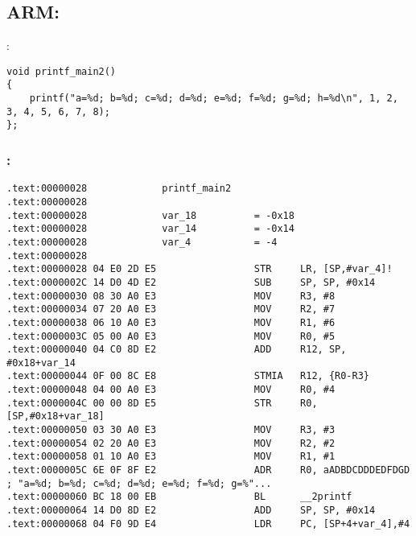 ﻿\subsection{ARM: }

:

\begin{lstlisting}
void printf_main2()
{
	printf("a=%d; b=%d; c=%d; d=%d; e=%d; f=%d; g=%d; h=%d\n", 1, 2, 3, 4, 5, 6, 7, 8);
};
\end{lstlisting}

\subsubsection{\OptimizingKeil: \ARMMode}

\begin{lstlisting}
.text:00000028             printf_main2
.text:00000028
.text:00000028             var_18          = -0x18
.text:00000028             var_14          = -0x14
.text:00000028             var_4           = -4
.text:00000028
.text:00000028 04 E0 2D E5                 STR     LR, [SP,#var_4]!
.text:0000002C 14 D0 4D E2                 SUB     SP, SP, #0x14
.text:00000030 08 30 A0 E3                 MOV     R3, #8
.text:00000034 07 20 A0 E3                 MOV     R2, #7
.text:00000038 06 10 A0 E3                 MOV     R1, #6
.text:0000003C 05 00 A0 E3                 MOV     R0, #5
.text:00000040 04 C0 8D E2                 ADD     R12, SP, #0x18+var_14
.text:00000044 0F 00 8C E8                 STMIA   R12, {R0-R3}
.text:00000048 04 00 A0 E3                 MOV     R0, #4
.text:0000004C 00 00 8D E5                 STR     R0, [SP,#0x18+var_18]
.text:00000050 03 30 A0 E3                 MOV     R3, #3
.text:00000054 02 20 A0 E3                 MOV     R2, #2
.text:00000058 01 10 A0 E3                 MOV     R1, #1
.text:0000005C 6E 0F 8F E2                 ADR     R0, aADBDCDDDEDFDGD ; "a=%d; b=%d; c=%d; d=%d; e=%d; f=%d; g=%"...
.text:00000060 BC 18 00 EB                 BL      __2printf
.text:00000064 14 D0 8D E2                 ADD     SP, SP, #0x14
.text:00000068 04 F0 9D E4                 LDR     PC, [SP+4+var_4],#4
\end{lstlisting}

